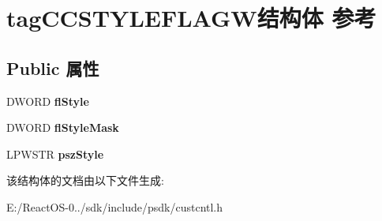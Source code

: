 \hypertarget{structtag_c_c_s_t_y_l_e_f_l_a_g_w}{}\section{tag\+C\+C\+S\+T\+Y\+L\+E\+F\+L\+A\+G\+W结构体 参考}
\label{structtag_c_c_s_t_y_l_e_f_l_a_g_w}
\subsection*{Public 属性}
\begin{DoxyCompactItemize}
\item 
\mbox{\label{structtag_c_c_s_t_y_l_e_f_l_a_g_w_a5ef16894dcdd6f241c0ad5e899611dde}} 
D\+W\+O\+RD {\bfseries fl\+Style}
\item 
\mbox{\label{structtag_c_c_s_t_y_l_e_f_l_a_g_w_a203442c7b3dabd55b72c86a6063b4354}} 
D\+W\+O\+RD {\bfseries fl\+Style\+Mask}
\item 
\mbox{\label{structtag_c_c_s_t_y_l_e_f_l_a_g_w_a07b772602396f6c2ede01e434e010930}} 
L\+P\+W\+S\+TR {\bfseries psz\+Style}
\end{DoxyCompactItemize}


该结构体的文档由以下文件生成\+:\begin{DoxyCompactItemize}
\item 
E\+:/\+React\+O\+S-\/0../sdk/include/psdk/custcntl.\+h\end{DoxyCompactItemize}
